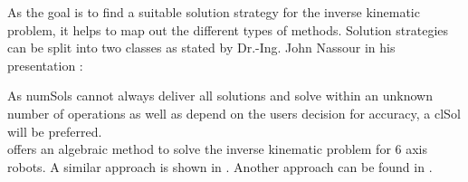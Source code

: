 As the goal is to find a suitable solution strategy for the inverse kinematic problem, it helps to map out the different types of methods.
Solution strategies can be split into two classes as stated by Dr.-Ing. John Nassour in his presentation \cite{invKinSeriallinkMani}:\\
\medskip


\medskip

As 
\glspl{numSol} 
cannot always deliver all solutions and solve within an unknown number of operations as well as depend on the users decision for accuracy, \cite{invKinSeriallinkMani} a \gls{clSol} will be preferred.\\

\cite{invKinSolYanWu} 
offers an  algebraic method to solve the inverse kinematic problem for 6 axis robots.
A similar approach is shown in %
\cite{FwdInvAnalysRobManip}. Another approach can be found in %
\cite{FwInvKuka}. \\

